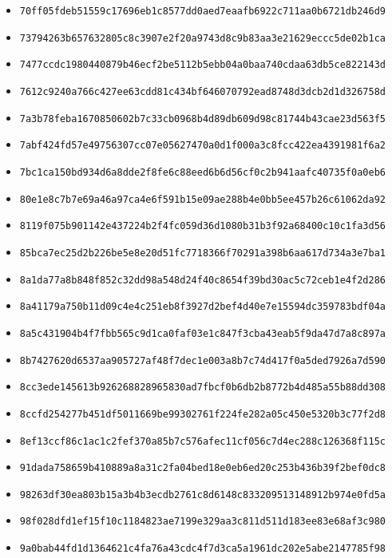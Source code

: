 {\begin{itemize}
    \item \texttt{70ff05fdeb51559c17696eb1c8577dd0aed7eaafb6922c711aa0b6721db246d9}
    \item \texttt{73794263b657632805c8c3907e2f20a9743d8c9b83aa3e21629eccc5de02b1ca}
    \item \texttt{7477ccdc1980440879b46ecf2be5112b5ebb04a0baa740cdaa63db5ce822143d}
    \item \texttt{7612c9240a766c427ee63cdd81c434bf646070792ead8748d3dcb2d1d326758d}
    \item \texttt{7a3b78feba1670850602b7c33cb0968b4d89db609d98c81744b43cae23d563f5}
    \item \texttt{7abf424fd57e49756307cc07e05627470a0d1f000a3c8fcc422ea4391981f6a2}
    \item \texttt{7bc1ca150bd934d6a8dde2f8fe6c88eed6b6d56cf0c2b941aafc40735f0a0eb6}
    \item \texttt{80e1e8c7b7e69a46a97ca4e6f591b15e09ae288b4e0bb5ee457b26c61062da92}
    \item \texttt{8119f075b901142e437224b2f4fc059d36d1080b31b3f92a68400c10c1fa3d56}
    \item \texttt{85bca7ec25d2b226be5e8e20d51fc7718366f70291a398b6aa617d734a3e7ba1}
    \item \texttt{8a1da77a8b848f852c32dd98a548d24f40c8654f39bd30ac5c72ceb1e4f2d286}
    \item \texttt{8a41179a750b11d09c4e4c251eb8f3927d2bef4d40e7e15594dc359783bdf04a}
    \item \texttt{8a5c431904b4f7fbb565c9d1ca0faf03e1c847f3cba43eab5f9da47d7a8c897a}
    \item \texttt{8b7427620d6537aa905727af48f7dec1e003a8b7c74d417f0a5ded7926a7d590}
    \item \texttt{8cc3ede145613b926268828965830ad7fbcf0b6db2b8772b4d485a55b88dd308}
    \item \texttt{8ccfd254277b451df5011669be99302761f224fe282a05c450e5320b3c77f2d8}
    \item \texttt{8ef13ccf86c1ac1c2fef370a85b7c576afec11cf056c7d4ec288c126368f115c}
    \item \texttt{91dada758659b410889a8a31c2fa04bed18e0eb6ed20c253b436b39f2bef0dc8}
    \item \texttt{98263df30ea803b15a3b4b3ecdb2761c8d6148c833209513148912b974e0fd5a}
    \item \texttt{98f028dfd1ef15f10c1184823ae7199e329aa3c811d511d183ee83e68af3c980}
    \item \texttt{9a0bab44fd1d1364621c4fa76a43cdc4f7d3ca5a1961dc202e5abe2147785f98}

\end{itemize}}
